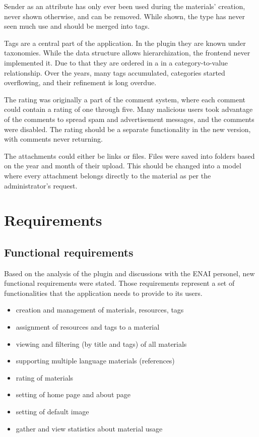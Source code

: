 \documentclass[
  digital,     %
  oneside,     %
  nosansbold,  %
  colorbold, %
  lof,         %
  lot,         %
]{fithesis4}
\begin{document}
Sender as an attribute has only ever been used during the materials' creation, never shown otherwise, and can be removed. While shown, the type has never seen much use and should be merged into tags.

Tags are a central part of the application. In the plugin they are known under taxonomies. While the data structure allows hierarchization, the frontend never implemented it. Due to that they are ordered in a in a category-to-value relationship. Over the years, many tags accumulated, categories started overflowing, and their refinement is long overdue.

The rating was originally a part of the comment system, where each comment could contain a rating of one through five. Many malicious users took advantage of the comments to spread spam and advertisement messages, and the comments were disabled. The rating should be a separate functionality in the new version, with comments never returning.

The attachments could either be links or files. Files were saved into folders based on the year and month of their upload. This should be changed into a model where every attachment belongs directly to the material as per the administrator's request.

\section{Requirements}

\subsection{Functional requirements}

Based on the analysis of the plugin and discussions with the ENAI personel, new functional requirements were stated. Those requirements represent a set of functionalities that the application needs to provide to its users.

\begin{itemize}
    \item creation and management of materials, resources, tags
    \item assignment of resources and tags to a material
    \item viewing and filtering (by title and tags) of all materials
    \item supporting multiple language materials (references)
    \item rating of materials
    \item setting of home page and about page
    \item setting of default image
    \item gather and view statistics about material usage
\end{itemize}
\end{document}
